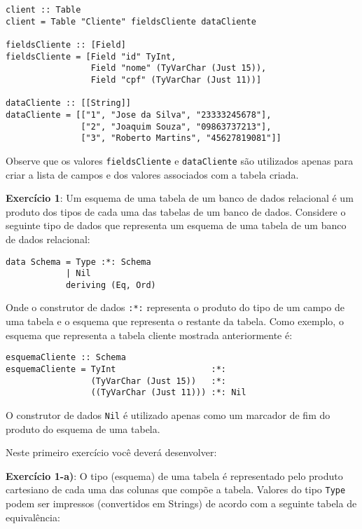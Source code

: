 \documentclass[11pt,a4paper]{report}
\begin{document}
\begin{verbatim}
client :: Table
client = Table "Cliente" fieldsCliente dataCliente

fieldsCliente :: [Field]
fieldsCliente = [Field "id" TyInt, 
                 Field "nome" (TyVarChar (Just 15)), 
                 Field "cpf" (TyVarChar (Just 11))]

dataCliente :: [[String]]
dataCliente = [["1", "Jose da Silva", "23333245678"], 
               ["2", "Joaquim Souza", "09863737213"], 
               ["3", "Roberto Martins", "45627819081"]]
\end{verbatim}

Observe que os valores \texttt{fieldsCliente} e \texttt{dataCliente} s\~ao utilizados apenas para criar a lista de campos
e dos valores associados com a tabela criada.
\begin{flushleft}
\textbf{Exerc\'icio 1}: Um esquema de uma tabela de um banco de dados relacional \'e um produto dos tipos de cada uma 
                        das tabelas de um banco de dados. 
                       Considere o seguinte tipo de dados que representa um esquema de uma tabela de um banco de dados
                       relacional:
\end{flushleft}
	\begin{verbatim}
data Schema = Type :*: Schema 
            | Nil 
            deriving (Eq, Ord)
	\end{verbatim}

Onde o construtor de dados \texttt{:*:} representa o produto do tipo de um campo de uma tabela e o esquema que
representa o restante da tabela. Como exemplo, o esquema que representa a tabela cliente mostrada anteriormente \'e:

\begin{verbatim}
esquemaCliente :: Schema
esquemaCliente = TyInt                   :*: 
                 (TyVarChar (Just 15))   :*:
                 ((TyVarChar (Just 11))) :*: Nil
\end{verbatim} 	

O construtor de dados \texttt{Nil} \'e utilizado apenas como um marcador de fim do produto do esquema de uma tabela.

Neste primeiro exerc\'icio voc\^e dever\'a desenvolver:

\textbf{Exerc\'icio 1-a)}: O tipo (esquema) de uma tabela \'e representado pelo produto cartesiano de cada uma das 
colunas que comp\~oe a tabela. Valores do tipo \texttt{Type} podem ser impressos (convertidos em Strings) de acordo com
 a seguinte tabela de equival\^encia:
 
\end{document}
